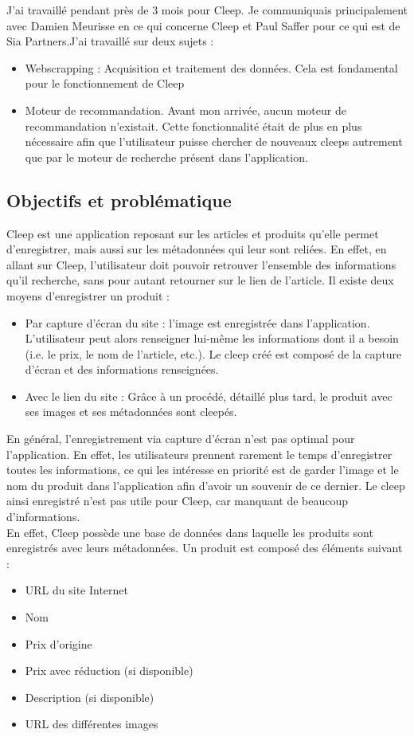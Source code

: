 \documentclass{article} %
\begin{document}
J'ai travaillé pendant près de 3 mois pour Cleep. Je communiquais principalement avec Damien Meurisse en ce qui concerne Cleep et Paul Saffer pour ce qui est de Sia Partners.J'ai travaillé sur deux sujets :
\begin{itemize}
 \item Webscrapping : Acquisition et traitement des données. Cela est fondamental pour le fonctionnement de Cleep
 \item Moteur de recommandation. Avant mon arrivée, aucun moteur de recommandation n'existait. Cette fonctionnalité était de plus en plus nécessaire afin que l'utilisateur puisse chercher de nouveaux cleeps autrement que par le moteur de recherche présent dans l'application.
\end{itemize}
\newpage
\subsection{Objectifs et problématique}
Cleep est une application reposant sur les articles et produits qu'elle permet d'enregistrer, mais aussi sur les métadonnées qui leur sont reliées. En effet, en allant sur Cleep, l'utilisateur doit pouvoir retrouver l'ensemble des informations qu'il recherche, sans pour autant retourner sur le lien de l'article. Il existe deux moyens d'enregistrer un produit :
\begin{itemize}
 \item Par capture d'écran du site : l'image est enregistrée dans l'application. L'utilisateur peut alors renseigner lui-même les informations dont il a besoin (i.e. le prix, le nom de l'article, etc.). Le cleep créé est composé de la capture d'écran et des informations renseignées.
 \item Avec le lien du site : Grâce à un procédé, détaillé plus tard, le produit avec ses images et ses métadonnées sont cleepés.
\end{itemize}
En général, l'enregistrement via capture d'écran n'est pas optimal pour l'application. En effet, les utilisateurs prennent rarement le temps d'enregistrer toutes les informations, ce qui les intéresse en priorité est de garder l'image et le nom du produit dans l'application afin d'avoir un souvenir de ce dernier. Le cleep ainsi enregistré n'est pas utile pour Cleep, car manquant de beaucoup d'informations.\\
En effet, Cleep possède une base de données dans laquelle les produits sont enregistrés avec leurs métadonnées. Un produit est composé des éléments suivant :
\begin{itemize}
 \itemsep 0em 
 \item URL du site Internet
 \item Nom
 \item Prix d'origine
 \item Prix avec réduction (si disponible)
 \item Description (si disponible)
 \item URL des différentes images
\end{itemize}
\end{document}
